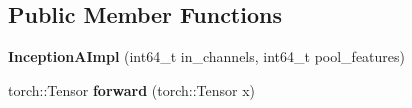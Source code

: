 \subsection*{Public Member Functions}
\begin{DoxyCompactItemize}
\item 
\mbox{\label{structvision_1_1models_1_1__inceptionimpl_1_1InceptionAImpl_a355e92e89ee9b74326f0dee1865026ec}} 
{\bfseries Inception\+A\+Impl} (int64\+\_\+t in\+\_\+channels, int64\+\_\+t pool\+\_\+features)
\item 
\mbox{\label{structvision_1_1models_1_1__inceptionimpl_1_1InceptionAImpl_aaf09c12d31e1df02c40b2bba540a743f}} 
torch\+::\+Tensor {\bfseries forward} (torch\+::\+Tensor x)
\end{DoxyCompactItemize}
